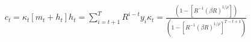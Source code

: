 \begin{align}
c_t = \kappa_t[m_t + h_t]
h_t = \sum_{i=t+1}^{T}R^{i-t}y_{i} 
\kappa_t = \frac{(1 - {[R^{-1}(\beta R)^{1/\rho}]})}{(1 - {[R^{-1}(\beta R)^{1/\rho}]}^{T-t+1})}
\end{align}